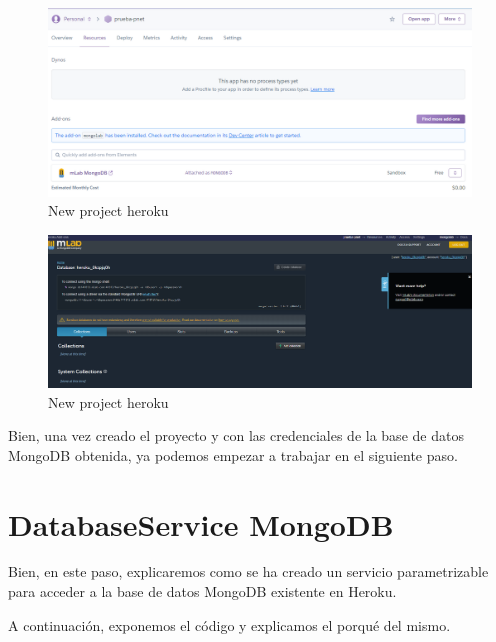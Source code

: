 \documentclass{article}
\begin{document}
\begin{figure}[H]
\centering
\includegraphics[width=\textwidth]{heroku/new_project6}
\caption{New project heroku}
\label{fig:universe}
\end{figure}

\begin{figure}[H]
\centering
\includegraphics[width=\textwidth]{heroku/new_project7}
\caption{New project heroku}
\label{fig:universe}
\end{figure}

Bien, una vez creado el proyecto y con las credenciales de la base de datos MongoDB obtenida, ya podemos empezar a trabajar en el siguiente paso.

\section{DatabaseService MongoDB}
Bien, en este paso, explicaremos como se ha creado un servicio parametrizable para acceder a la base de datos MongoDB existente en Heroku.

A continuación, exponemos el código y explicamos el porqué del mismo.
\end{document}
